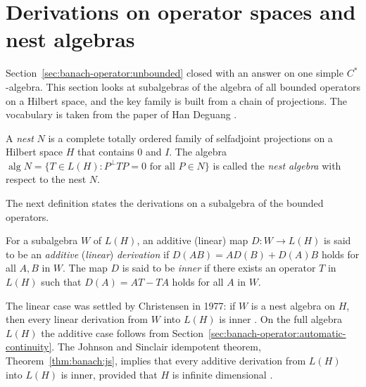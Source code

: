 \section{Derivations on operator spaces and nest algebras}\label{sec:banach-operator:operator-derivations}

Section~\ref{sec:banach-operator:unbounded} closed with an answer on one
simple $C^*$-algebra. This section looks at subalgebras of the algebra of
all bounded operators on a Hilbert space, and the key family is built from
a chain of projections. The vocabulary is taken from the paper of Han Deguang
\cite[p.~1165]{HanDeguang1993Nest}.

\begin{definition}\label{def:banach:nest}
A \emph{nest} $N$ is a complete totally ordered family of selfadjoint
projections on a Hilbert space $H$ that contains $0$ and $I$. The algebra
$\operatorname{alg}N=\{T\in L(H):P^{\perp}TP=0\text{ for all }P\in N\}$ is
called the \emph{nest algebra} with respect to the nest $N$.
\end{definition}

The next definition states the derivations on a subalgebra of the bounded operators.

\begin{definition}\label{def:banach:additiveder}
For a subalgebra $W$ of $L(H)$, an additive (linear) map
$D:W\rightarrow L(H)$ is said to be an \emph{additive} (\emph{linear})
\emph{derivation} if $D(AB)=AD(B)+D(A)B$ holds for all $A,B$ in $W$. The
map $D$ is said to be \emph{inner} if there exists an operator $T$ in
$L(H)$ such that $D(A)=AT-TA$ holds for all $A$ in $W$.
\end{definition}

The linear case was settled by Christensen in 1977: if $W$ is a nest
algebra on $H$, then every linear derivation from $W$ into $L(H)$ is inner
\cite[p.~1165]{HanDeguang1993Nest}. On the full algebra $L(H)$ the additive case follows from
Section~\ref{sec:banach-operator:automatic-continuity}. The Johnson and
Sinclair idempotent theorem, Theorem~\ref{thm:banach:js}, implies that
every additive derivation from $L(H)$ into $L(H)$ is inner, provided that
$H$ is infinite dimensional \cite[p.~1165]{HanDeguang1993Nest}.


